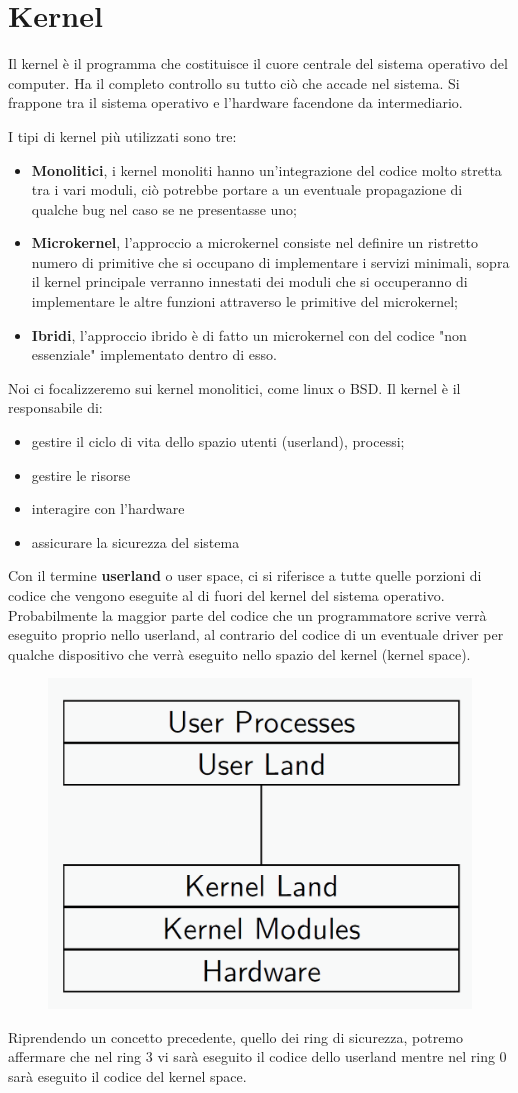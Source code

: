 \section{Kernel}
Il kernel è il programma che costituisce il cuore centrale del sistema operativo del computer. Ha il completo controllo su tutto ciò che accade nel sistema.
Si frappone tra il sistema operativo e l'hardware facendone da intermediario.

I tipi di kernel più utilizzati sono tre:
\begin{itemize}
    \item \textbf{Monolitici}, i kernel monoliti hanno un'integrazione del codice molto stretta tra i vari moduli, ciò potrebbe portare a un eventuale propagazione di qualche bug nel caso se ne presentasse uno;
    \item \textbf{Microkernel}, l'approccio a microkernel consiste nel definire un ristretto numero di primitive che si occupano di implementare i servizi minimali, sopra il kernel principale verranno innestati dei moduli che si occuperanno di implementare le altre funzioni attraverso le primitive del microkernel;
    \item \textbf{Ibridi}, l'approccio ibrido è di fatto un microkernel con del codice "non essenziale" implementato dentro di esso.
\end{itemize}
Noi ci focalizzeremo sui kernel monolitici, come linux o BSD. Il kernel è il responsabile di:
\begin{itemize}
    \item gestire il ciclo di vita dello spazio utenti (userland), processi;
    \item gestire le risorse
    \item interagire con l'hardware
    \item assicurare la sicurezza del sistema
\end{itemize}

Con il termine \textbf{userland} o user space, ci si riferisce a tutte quelle porzioni di codice che vengono eseguite al di fuori del kernel del sistema operativo. Probabilmente la maggior parte del codice che un programmatore scrive verrà eseguito proprio nello userland, al contrario del codice di un eventuale driver per qualche dispositivo che verrà eseguito nello spazio del kernel (kernel space).
\begin{figure}[h!]
    \centering
    \includegraphics[width=.5\linewidth]{res/userland.png}
    \caption{}
\end{figure}
Riprendendo un concetto precedente, quello dei ring di sicurezza, potremo affermare che nel ring 3 vi sarà eseguito il codice dello userland mentre nel ring 0 sarà eseguito il codice del kernel space.

